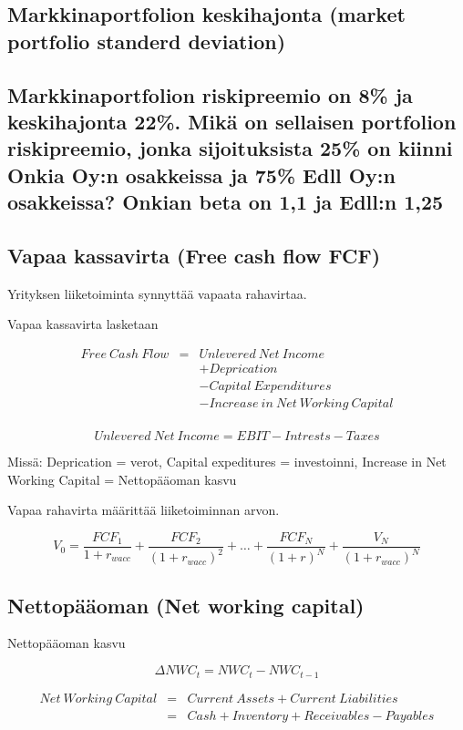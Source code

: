 \documentclass[a4paper]{article}
\begin{document}
\subsection{Markkinaportfolion keskihajonta (market portfolio standerd deviation)}

\subsection{Markkinaportfolion riskipreemio on 8\% ja keskihajonta 22\%. Mikä on sellaisen portfolion riskipreemio, jonka sijoituksista 25\% on kiinni Onkia Oy:n osakkeissa ja 75\% Edll Oy:n osakkeissa? Onkian beta on 1,1 ja Edll:n 1,25}

\subsection{Vapaa kassavirta (Free cash flow FCF)}

Yrityksen liiketoiminta synnyttää vapaata rahavirtaa.

Vapaa kassavirta lasketaan

\[
\begin{array}{lcl}
Free\ Cash\ Flow & = & Unlevered\ Net\ Income \\
 & & + Deprication \\
 & & - Capital\ Expenditures \\
 & & - Increase\ in\ Net\ Working\ Capital \\
\end{array}
\]

\[Unlevered\ Net\ Income = EBIT - Intrests - Taxes\]


Missä: Deprication = verot, Capital expeditures = investoinni, Increase in Net Working Capital = Nettopääoman kasvu

Vapaa rahavirta määrittää liiketoiminnan arvon.

\[
V_0 = \frac{FCF_1}{1 + r_{wacc}} + \frac{FCF_2}{(1 + r_{wacc})^2} + \dots + \frac{FCF_N}{(1 + r)^N} + \frac{V_N}{(1 + r_{wacc})^N}
\]

\subsection{Nettopääoman (Net working capital)}

Nettopääoman kasvu

\[ \Delta NWC_t = NWC_t - NWC_{t-1} \]

\[
\begin{array}{lcl}
Net\ Working\ Capital & = & Current\ Assets + Current\ Liabilities \\
 & = & Cash + Inventory + Receivables - Payables \\
\end{array}
\]
\end{document}

